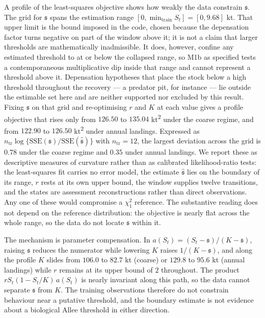 \documentclass[11pt]{article}
\begin{document}
A profile of the least-squares objective shows how weakly the data
constrain \(\mathfrak s\). The grid for \(\mathfrak s\) spans the estimation range
\([0, \min_{\mathrm{train}} S_t] = [0, 9.68]\) kt. That upper limit is
the bound imposed in the code, chosen because the depensation factor
turns negative on part of the window above it; it is not a claim that
larger thresholds are mathematically inadmissible. It does, however,
confine any estimated threshold to at or below the collapsed range, so
M1b as specified tests a contemporaneous multiplicative dip inside that
range and cannot represent a threshold above it. Depensation
hypotheses that place the stock below a high threshold throughout the
recovery --- a predator pit, for instance --- lie outside the estimable
set here and are neither supported nor excluded by this result. Fixing
\(\mathfrak s\) on that grid and re-optimising \(r\) and \(K\) at each
value gives a profile objective that rises only from \(126.50\) to
\(135.04\) kt\textsuperscript{2} under the coarse regime, and from
\(122.90\) to \(126.50\) kt\textsuperscript{2} under annual landings. Expressed as
\(n_{\mathrm{tr}}\log\{\mathrm{SSE}(\mathfrak s)/
\mathrm{SSE}(\hat{\mathfrak s})\}\) with \(n_{\mathrm{tr}}=12\), the
largest deviation across the grid is \(0.78\) under the coarse regime
and \(0.35\) under annual landings. We report these as descriptive
measures of curvature rather than as calibrated likelihood-ratio tests:
the least-squares fit carries no error model, the estimate
\(\hat{\mathfrak s}\) lies on the boundary of its range, \(r\) rests
at its own upper bound, the window supplies twelve transitions, and the
states are assessment reconstructions rather than direct observations.
Any one of these would compromise a \(\chi^2_1\) reference. The
substantive reading does not depend on the reference distribution: the
objective is nearly flat across the whole range, so the data do not
locate \(\mathfrak s\) within it.

The mechanism is parameter compensation. In
\(a(S_t)=(S_t-\mathfrak s)/(K-\mathfrak s)\), raising \(\mathfrak s\)
reduces the numerator while lowering \(K\) raises \(1/(K-\mathfrak s)\),
and along the profile \(K\) slides from \(106.0\) to \(82.7\) kt
(coarse) or \(129.8\) to \(95.6\) kt (annual landings) while \(r\)
remains at its upper bound of \(2\) throughout. The product
\(rS_t(1-S_t/K)\,a(S_t)\) is nearly invariant along this path, so the
data cannot separate \(\mathfrak s\) from \(K\). The training
observations therefore do not constrain behaviour near a putative
threshold, and the boundary estimate is not evidence about a biological
Allee threshold in either direction.
\end{document}
